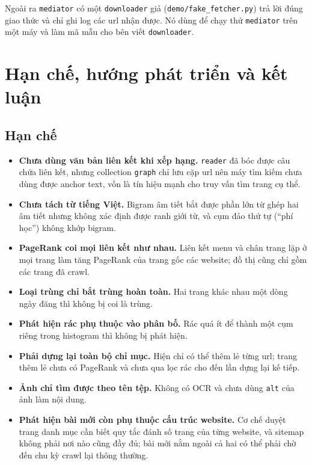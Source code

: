 \documentclass[12pt,a4paper]{report}
\begin{document}
Ngoài ra \texttt{mediator} có một \texttt{downloader} giả (\texttt{demo/fake\_\allowbreak{}fetcher.py}) trả lời đúng giao thức và chỉ
ghi log các url nhận được. Nó dùng để chạy thử \texttt{mediator} trên một máy và làm mã mẫu cho bên viết
\texttt{downloader}.

\chapter{Hạn chế, hướng phát triển và kết luận}\label{ch:limit}

\section{Hạn chế}

\begin{itemize}
  \item \textbf{Chưa dùng văn bản liên kết khi xếp hạng.} \texttt{reader} đã bóc được câu chứa liên kết, nhưng collection
        \texttt{graph} chỉ lưu cặp url nên máy tìm kiếm chưa dùng được anchor text, vốn là tín hiệu mạnh cho truy vấn
        tìm trang cụ thể.
  \item \textbf{Chưa tách từ tiếng Việt.} Bigram âm tiết bắt được phần lớn từ ghép hai âm tiết nhưng không xác định được
        ranh giới từ, và cụm đảo thứ tự (``phí học'') không khớp bigram.
  \item \textbf{PageRank coi mọi liên kết như nhau.} Liên kết menu và chân trang lặp ở mọi trang làm tăng PageRank của
        trang gốc các website; đồ thị cũng chỉ gồm các trang đã crawl.
  \item \textbf{Loại trùng chỉ bắt trùng hoàn toàn.} Hai trang khác nhau một dòng ngày đăng thì không bị coi là trùng.
  \item \textbf{Phát hiện rác phụ thuộc vào phân bố.} Rác quá ít để thành một cụm riêng trong histogram thì không bị
        phát hiện.
  \item \textbf{Phải dựng lại toàn bộ chỉ mục.} Hiện chỉ có thể thêm lẻ từng url; trang thêm lẻ chưa có PageRank và chưa
        qua lọc rác cho đến lần dựng lại kế tiếp.
  \item \textbf{Ảnh chỉ tìm được theo tên tệp.} Không có OCR và chưa dùng \texttt{alt} của ảnh làm nội dung.
  \item \textbf{Phát hiện bài mới còn phụ thuộc cấu trúc website.} Cơ chế duyệt trang danh mục cần biết quy tắc đánh số trang của từng website, và sitemap không phải nơi nào cũng đầy đủ; bài mới nằm ngoài cả hai có thể phải chờ đến chu kỳ crawl lại thông thường.

\end{itemize}
\end{document}
